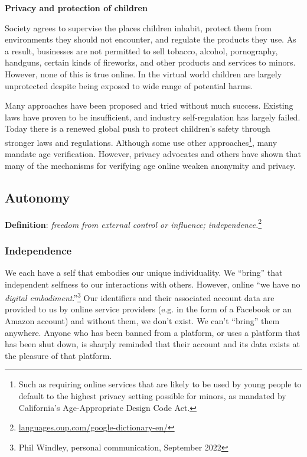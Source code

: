 \documentclass[11pt, oneside]{article}   	%
\newcommand{\hyperfootnote}[1][]{\def\ArgI{{#1}}\hyperfootnoteRelay}
\newcommand\hyperfootnoteRelay[2][]{\href{#1#2}{\ArgI}\footnote{\href{#1#2}{#2}}}
\begin{document}
\textbf{Privacy and protection of children}

Society agrees to supervise the places children inhabit, protect them from environments they should not encounter, and regulate the products they use. As a result, businesses are not permitted to sell tobacco, alcohol, pornography, handguns, certain kinds of fireworks, and other products and services to minors. However, none of this is true online. In the virtual world children are largely unprotected despite being exposed to wide range of potential harms. 

Many approaches have been proposed and tried without much success. Existing laws have proven to be insufficient, and industry self-regulation has largely failed. Today there is a renewed global push to protect children's safety through stronger laws and regulations. Although some use other approaches\footnote{Such as requiring online services that are likely to be used by young people to default to the highest privacy setting possible for minors, as mandated by California's Age-Appropriate Design Code Act.}, many mandate age verification.\cite{Griswold2023}\cite{Jackson2023} However, privacy advocates and others have shown that many of the mechanisms for verifying age online weaken anonymity and privacy.\cite{Roth2023}

\subsection{Autonomy}

\textbf{Definition}: \emph{freedom from external control or influence; independence.}\hyperfootnote[][https://]{languages.oup.com/google-dictionary-en/}

\subsubsection{Independence} 

We each have a self that embodies our unique individuality. We ``bring'' that independent selfness to our interactions with others. However, online ``we have no \emph{digital embodiment}.''\footnote{Phil Windley, personal communication, September 2022} Our identifiers and their associated account data are provided to us by online service providers (e.g. in the form of a Facebook or an Amazon account) and without them, we don't exist. We can't ``bring'' them anywhere. Anyone who has been banned from a platform, or uses a platform that has been shut down, is sharply reminded that their account and its data exists at the pleasure of that platform. 
\end{document}
